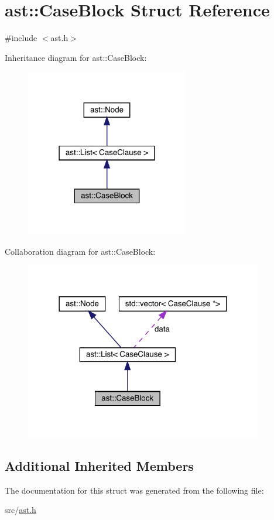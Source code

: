 \hypertarget{structast_1_1_case_block}{}\section{ast\+:\+:Case\+Block Struct Reference}
\label{structast_1_1_case_block}


{\ttfamily \#include $<$ast.\+h$>$}



Inheritance diagram for ast\+:\+:Case\+Block\+:\nopagebreak
\begin{figure}[H]
\begin{center}
\leavevmode
\includegraphics[width=202pt]{structast_1_1_case_block__inherit__graph}
\end{center}
\end{figure}


Collaboration diagram for ast\+:\+:Case\+Block\+:\nopagebreak
\begin{figure}[H]
\begin{center}
\leavevmode
\includegraphics[width=294pt]{structast_1_1_case_block__coll__graph}
\end{center}
\end{figure}
\subsection*{Additional Inherited Members}


The documentation for this struct was generated from the following file\+:\begin{DoxyCompactItemize}
\item 
src/\hyperlink{ast_8h}{ast.\+h}\end{DoxyCompactItemize}
